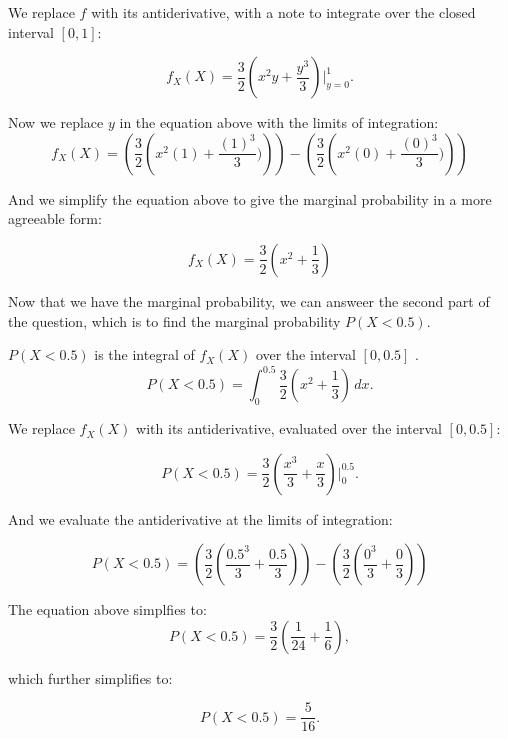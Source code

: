 \documentclass[a4paper,11pt]{article}
\begin{document}
We replace $f$ with its antiderivative, with a note to integrate over the
closed interval $\left[ 0 , 1\right]$:

\begin{equation}
  f_{X}\left(X \right) =  \frac{3}{2}\left( x^{2}y + \frac{y^3}{3} \right)
  \bigg\rvert_{y=0}^1.
\end{equation}

Now we replace $y$ in the equation above with the limits of integration:
\begin{equation}
  f_{X}\left(X \right) = \left( \frac{3}{2} \left( x^2 \left(1 \right)
      + \frac{ \left(1 \right)^3}{3}) \right) \right)
  - \left( \frac{3}{2} \left( x^2 \left(0 \right)
      + \frac{ \left(0 \right)^3}{3}) \right) \right)
\end{equation}

And we simplify the equation above to give the marginal probability in a more
agreeable form:

\begin{equation}
  f_{X}\left(X \right) = \frac{3}{2} \left( x^2 + \frac{1}{3} \right)
\end{equation}

Now that we have the marginal probability, we can answeer the second part of
the question, which is to find the marginal probability
$P \left( X < 0.5 \right)$.

$P \left( X < 0.5 \right)$ is the integral of $f_{X}\left(X \right)$ over the
interval $\left[0, 0.5 \right]$ \cite{reading7}.
\begin{equation}
  P \left( X < 0.5 \right) = \int_0^{0.5}
   \frac{3}{2} \left( x^2 + \frac{1}{3} \right) \,dx.
\end{equation}

We replace $f_{X}\left( X \right)$ with its antiderivative, evaluated over
the interval $\left[0, 0.5 \right]$:

\begin{equation}
  P \left( X < 0.5 \right) =
   \frac{3}{2} \left( \frac{x^3}{3} + \frac{x}{3} \right) \bigg\rvert_0^{0.5}.
\end{equation}

And we evaluate the antiderivative at the limits of integration:

\begin{equation}
  P \left( X < 0.5 \right) =
   \left( \frac{3}{2} \left( \frac{0.5^3}{3} + \frac{0.5}{3} \right) \right)
   - \left( \frac{3}{2} \left( \frac{0^3}{3} + \frac{0}{3} \right) \right)
\end{equation}

The equation above simplfies to:
\begin{equation}
  P \left( X < 0.5 \right) =
   \frac{3}{2} \left( \frac{1}{24} + \frac{1}{6} \right),
\end{equation}

which further simplifies to:

\begin{equation}
  P \left( X < 0.5 \right) = \frac{5}{16}.
\end{equation}
\printbibliography{}
\end{document}

